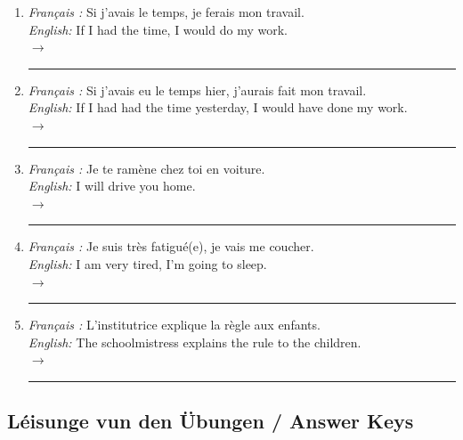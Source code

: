 \begin{enumerate}
    \item \textit{Français :} Si j'avais le temps, je ferais mon travail. \\
    \textit{English:} If I had the time, I would do my work. \\
    $\rightarrow$ \rule{10cm}{0.4pt}

    \item \textit{Français :} Si j'avais eu le temps hier, j'aurais fait mon travail. \\
    \textit{English:} If I had had the time yesterday, I would have done my work. \\
    $\rightarrow$ \rule{10cm}{0.4pt}

    \item \textit{Français :} Je te ramène chez toi en voiture. \\
    \textit{English:} I will drive you home. \\
    $\rightarrow$ \rule{10cm}{0.4pt}

    \item \textit{Français :} Je suis très fatigué(e), je vais me coucher. \\
    \textit{English:} I am very tired, I'm going to sleep. \\
    $\rightarrow$ \rule{10cm}{0.4pt}

    \item \textit{Français :} L'institutrice explique la règle aux enfants. \\
    \textit{English:} The schoolmistress explains the rule to the children. \\
    $\rightarrow$ \rule{10cm}{0.4pt}
\end{enumerate}

\vspace{1.5em}

\subsection*{Léisunge vun den Übungen / Answer Keys}

